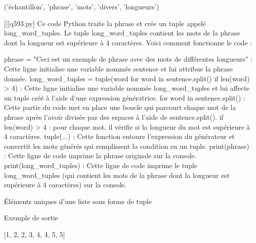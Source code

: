 ('échantillon', 'phrase', 'mots', 'divers', 'longueurs')
        \par
        \begin{solution}
            \renewcommand{\nomfichier}{q593.py}
            \pythonfile{\chemincode \nomfichier}[][\nomfichier]
            Ce code Python traite la phrase et crée un tuple appelé long_word_tuples. Le tuple long_word_tuples contient les mots de la phrase dont la longueur est supérieure à 4 caractères. Voici comment fonctionne le code :

    phrase = "Ceci est un exemple de phrase avec des mots de différentes longueurs" : Cette ligne initialise une variable nommée sentence et lui attribue la phrase donnée.
    long_word_tuples = tuple(word for word in sentence.split() if len(word) > 4) : Cette ligne initialise une variable nommée long_word_tuples et lui affecte un tuple créé à l'aide d'une expression génératrice.
        for word in sentence.split() : Cette partie du code met en place une boucle qui parcourt chaque mot de la phrase après l'avoir divisée par des espaces à l'aide de sentence.split().
        if len(word) > 4 : pour chaque mot, il vérifie si la longueur du mot est supérieure à 4 caractères.
        tuple(...) : Cette fonction entoure l'expression du générateur et convertit les mots générés qui remplissent la condition en un tuple.
    print(phrase) : Cette ligne de code imprime la phrase originale sur la console.
    print(long_word_tuples) : Cette ligne de code imprime le tuple long_word_tuples (qui contient les mots de la phrase dont la longueur est supérieure à 4 caractères) sur la console.
        \end{solution}
        

        \question
        Éléments uniques d'une liste sous forme de tuple

Exemple de sortie

[1, 2, 2, 3, 4, 4, 5, 5]

